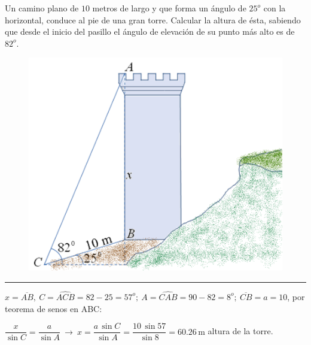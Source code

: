 \begin{miejercicio}

\begin{multicols}{2}

Un camino plano de $10$ metros de largo y que forma un ángulo de $25^o$ con la horizontal, conduce al pie de una gran torre. Calcular la altura de ésta, sabiendo que desde el inicio del pasillo el ángulo de elevación de su punto más alto es de $82^o$.
 
	\begin{figure}[H]
	\centering
	\includegraphics[width=.3\textwidth]{img-triang/triang17.png}
\end{figure}
\end{multicols}

\vspace{-8mm}


\rule{250pt}{0.1pt}

\vspace{2mm} $x=\overline{AB},\ C=\widehat{ACB}=82-25=57^o;\ A=\widehat{CAB}=90-82=8^o;\ \overline{CB}=a=10$, por teorema de senos en ABC:

\vspace{2mm} $\dfrac{x}{\sin C}=\dfrac{a}{\sin A}\ \to \ x=\dfrac{a\, \sin C}{\sin A}=\dfrac{10\, \sin 57}{\sin 8}=60.26 \, \mathrm{m}$ altura de la torre.

	
\end{miejercicio}


